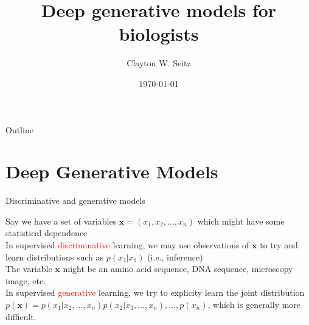\documentclass{beamer}					%
\title{Deep generative models for biologists}	%
\author{Clayton W. Seitz}								%
\date{\today}									%
\begin{document}
\begin{frame}
  \titlepage
\end{frame}

\begin{frame}{Outline}
  \tableofcontents
\end{frame}

%


\section{Deep Generative Models}

\begin{frame}{Discriminative and generative models}

Say we have a set of variables $\mathbf{x} = (x_{1},x_{2},...,x_{n})$ which might have some statistical dependence\\
\vspace{0.2in}
In supervised \textcolor{red}{discriminative} learning, we may use observations of $\mathbf{x}$ to try and learn distributions such as $p(x_{2}|x_{1})$ (i.e., inference)\\
\vspace{0.2in}
The variable $\mathbf{x}$ might be an amino acid sequence, DNA sequence, microscopy image, etc.\\
\vspace{0.2in}
In supervised \textcolor{red}{generative} learning, we try to explicity learn the joint distribution $p(\mathbf{x})=p(x_{1}|x_{2},...,x_{n})p(x_{2}|x_{3},...,x_{n}),...,p(x_{n})$, which is generally more difficult. 

\end{frame}
\end{document}
